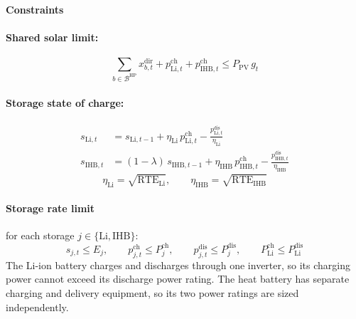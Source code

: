 \documentclass[11pt]{article}
\newcommand{\Li}{\mathrm{Li}}
\newcommand{\IHB}{\mathrm{IHB}}
\newcommand{\HP}{\mathrm{HP}}
\newcommand{\PV}{\mathrm{PV}}
\newcommand{\ch}{\mathrm{ch}}
\newcommand{\dis}{\mathrm{dis}}
\begin{document}
\paragraph*{Constraints}

\paragraph{Shared solar limit:}
\begin{equation}
\sum_{b \in \mathcal{B}^{\HP}} x_{b,t}^{\mathrm{dir}} + p_{\Li,t}^{\ch} + p_{\IHB,t}^{\ch} \leq P_{\PV}\, g_{t}
\label{eq:solar}
\end{equation}

\paragraph{Storage state of charge:}
\begin{align}
s_{\Li,t}  &= s_{\Li,t-1} + \eta_{\Li}\, p_{\Li,t}^{\ch} - \frac{p_{\Li,t}^{\dis}}{\eta_{\Li}} \label{eq:soc-li}\\
s_{\IHB,t} &= (1-\lambda)\, s_{\IHB,t-1} + \eta_{\IHB}\, p_{\IHB,t}^{\ch} - \frac{p_{\IHB,t}^{\dis}}{\eta_{\IHB}} \label{eq:soc-ihb}
\end{align}
\begin{equation}
\eta_{\Li} = \sqrt{\mathrm{RTE}_{\Li}}, \qquad \eta_{\IHB} = \sqrt{\mathrm{RTE}_{\IHB}}
\end{equation}

\paragraph{Storage rate limit} for each storage $j \in \{\Li, \IHB\}$:
\begin{equation}
s_{j,t} \leq E_{j}, \qquad p_{j,t}^{\ch} \leq P_{j}^{\ch}, \qquad p_{j,t}^{\dis} \leq P_{j}^{\dis}, \qquad P_{\Li}^{\ch} \leq P_{\Li}^{\dis}
\label{eq:rate}
\end{equation}
The Li-ion battery charges and discharges through one inverter, so its charging power cannot exceed its discharge power rating. The heat battery has separate charging and delivery equipment, so its two power ratings are sized independently.
\end{document}

